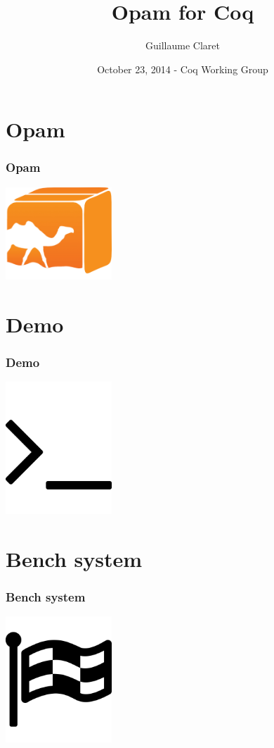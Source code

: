 \documentclass{beamer}
\begin{document}
  \title{Opam for Coq}
  \author{Guillaume Claret}
  \date{October 23, 2014 - Coq Working Group}
  \maketitle

  \begin{frame}
    \tableofcontents
  \end{frame}

  \section{Opam}
  \begin{frame}
    \frametitle{Opam}
    \begin{center}
      \includegraphics[width=4cm]{images/opam}
    \end{center}
  \end{frame}

  \section{Demo}
  \begin{frame}
    \frametitle{Demo}
    \begin{center}
      \includegraphics[width=4cm]{images/demo}
    \end{center}
  \end{frame}

  \section{Bench system}
  \begin{frame}
    \frametitle{Bench system}
    \begin{center}
      \includegraphics[width=4cm]{images/bench}
    \end{center}
  \end{frame}
\end{document}
